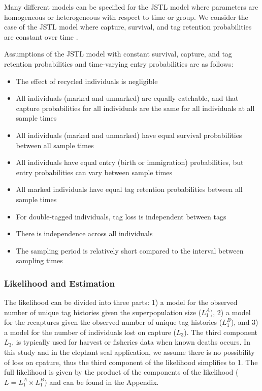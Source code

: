 \documentclass[]{article}
\providecommand{\tightlist}{%
  \setlength{\itemsep}{0pt}\setlength{\parskip}{0pt}}
\begin{document}
Many different models can be specified for the JSTL model where
parameters are homogeneous or heterogeneous with respect to time or
group. We consider the case of the JSTL model where capture, survival,
and tag retention probabilities are constant over time \citep{Cowen:2006}.

Assumptions of the JSTL model with constant survival, capture, and tag
retention probabilities and time-varying entry probabilities are as
follows:

\begin{itemize}
\tightlist
\item
  The effect of recycled individuals is negligible
\item
  All individuals (marked and unmarked) are equally catchable, and that
  capture probabilities for all individuals are the same for all
  individuals at all sample times
\item
  All individuals (marked and unmarked) have equal survival
  probabilities between all sample times
\item
  All individuals have equal entry (birth or immigration) probabilities,
  but entry probabilities can vary between sample times
\item
  All marked individuals have equal tag retention probabilities between
  all sample times
\item
  For double-tagged individuals, tag loss is independent between tags
\item
  There is independence across all individuals
\item
  The sampling period is relatively short compared to the interval
  between sampling times
\end{itemize}

\subsubsection{Likelihood and
Estimation}\label{likelihood-and-estimation}

The likelihood can be divided into three parts: 1) a model for the observed number of unique tag histories given the superpopulation size ($L_1^A$), 2) a model for the recaptures given the observed number of unique tag histories ($L_1^B$), and 3) a model for the number of individuals lost on capture ($L_3$).  The third component $L_3$, is typically used for harvest or fisheries data when known deaths occurs.  In this study and in the elephant seal application, we assume there is no possibility of loss on cpature, thus the third component of the likelihood simplifies to 1. The
full likelihood is given by the product of the components of the
likelihood (\(L=L_1^A \times L_1^B\)) and can be found in the Appendix.
\end{document}
